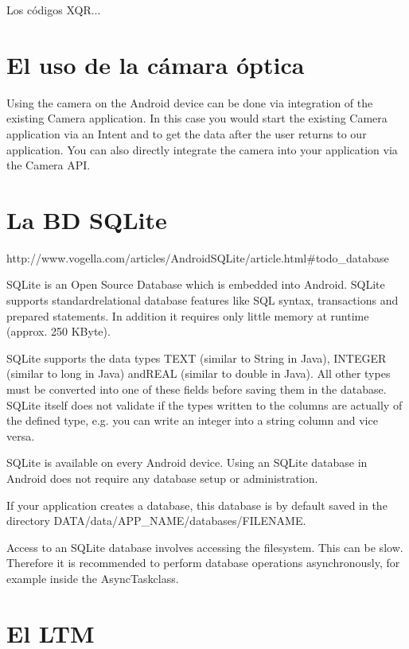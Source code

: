 Los c\'odigos XQR...

\section{El uso de la c\'amara \'optica}
\label{sec:tpv.camera}

Using the camera on the Android device can be done via integration of the existing Camera application. In this case you would start the existing Camera application via an Intent and to get the data after the user returns to our application.
You can also directly integrate the camera into your application via the Camera API.

\section{La \ac{BD} SQLite}
\label{sec:tpv.bd}

http://www.vogella.com/articles/AndroidSQLite/article.html\#todo\_database


SQLite is an Open Source Database which is embedded into Android. SQLite supports standardrelational database features like SQL syntax, transactions and prepared statements. In addition it requires only little memory at runtime (approx. 250 KByte).

SQLite supports the data types TEXT (similar to String in Java), INTEGER (similar to long in Java) andREAL (similar to double in Java). All other types must be converted into one of these fields before saving them in the database. SQLite itself does not validate if the types written to the columns are actually of the defined type, e.g. you can write an integer into a string column and vice versa.

SQLite is available on every Android device. Using an SQLite database in Android does not require any database setup or administration.

If your application creates a database, this database is by default saved in the directory DATA/data/APP\_NAME/databases/FILENAME.

Access to an SQLite database involves accessing the filesystem. This can be slow. Therefore it is recommended to perform database operations asynchronously, for example inside the AsyncTaskclass.

\section{El \ac{LTM}}
\label{sec:tpv.ltm}

